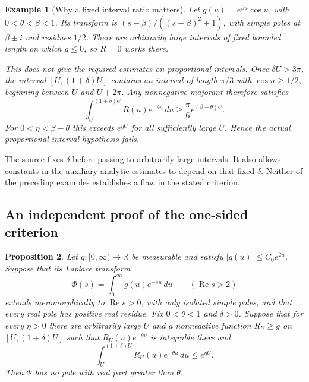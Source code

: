 \documentclass[11pt,a4paper]{article}
\newtheorem{proposition}{Proposition}[section]
\newtheorem{example}[proposition]{Example}
\theoremstyle{remark}
\newcommand{\R}{\mathbb R}
\DeclareMathOperator{\Rea}{Re}
\begin{document}
\begin{example}[Why a fixed interval ratio matters]
Let $g(u)=e^{\beta u}\cos u$, with $0<\theta<\beta<1$. Its transform is
$(s-\beta)/((s-\beta)^2+1)$, with simple poles at $\beta\pm i$ and residues $1/2$. There are arbitrarily large intervals of fixed bounded length on which $g\le0$, so $R=0$ works there.

This does not give the required estimates on proportional intervals. Once $\delta U>3\pi$, the interval $[U,(1+\delta)U]$ contains an interval of length $\pi/3$ with $\cos u\ge1/2$, beginning between $U$ and $U+2\pi$. Any nonnegative majorant therefore satisfies
\[
 \int_U^{(1+\delta)U}R(u)e^{-\theta u}\,du
 \ge\frac{\pi}{6}e^{(\beta-\theta)U}.
\]
For $0<\eta<\beta-\theta$ this exceeds $e^{\eta U}$ for all sufficiently large $U$. Hence the actual proportional-interval hypothesis fails.
\end{example}
The source fixes $\delta$ before passing to arbitrarily large intervals. It also allows constants in the auxiliary analytic estimates to depend on that fixed $\delta$. Neither of the preceding examples establishes a flaw in the stated criterion.

\subsection{An independent proof of the one-sided criterion}

\begin{proposition}\label{prop:landau-independent}
Let $g:[0,\infty)\to\R$ be measurable and satisfy
$|g(u)|\le C_0e^{2u}$. Suppose that its Laplace transform
\[
 \Phi(s)=\int_0^\infty g(u)e^{-su}\,du\qquad(\Rea s>2)
\]
extends meromorphically to $\Rea s>0$, with only isolated simple poles,
and that every real pole has positive real residue.
Fix $0<\theta<1$ and $\delta>0$. Suppose that for every $\eta>0$
there are arbitrarily large $U$ and a nonnegative function $R_U\ge g$
on $[U,(1+\delta)U]$ such that $R_U(u)e^{-\theta u}$ is integrable there and
\[
 \int_U^{(1+\delta)U}R_U(u)e^{-\theta u}\,du\le e^{\eta U}.
\]
Then $\Phi$ has no pole with real part greater than $\theta$.
\end{proposition}
\end{document}
